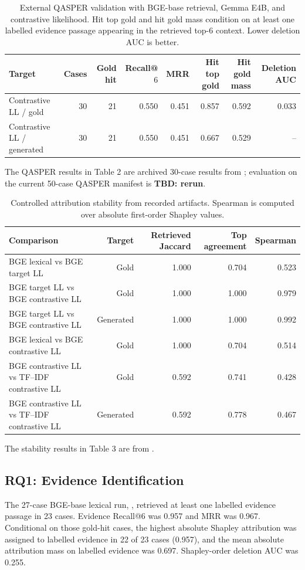 \documentclass[10pt]{article}
\newcommand{\tbd}[1]{\textbf{TBD: #1}}
\begin{document}
\begin{table}[ht]
\centering
\small
\caption{External QASPER validation with BGE-base retrieval, Gemma E4B, and
contrastive likelihood. Hit top gold and hit gold mass condition on at least
one labelled evidence passage appearing in the retrieved top-6 context. Lower
deletion AUC is better.}
\begin{tabular}{lrrrrrrr}
\toprule
Target & Cases & Gold hit & Recall@$6$ & MRR & Hit top gold & Hit gold mass & Deletion AUC \\
\midrule
Contrastive LL / gold & 30 & 21 & 0.550 & 0.451 & 0.857 & 0.592 & 0.033 \\
Contrastive LL / generated & 30 & 21 & 0.550 & 0.451 & 0.667 & 0.529 & -- \\
\bottomrule
\end{tabular}
\end{table}
The QASPER results in Table 2 are archived 30-case results from
; evaluation on the
current 50-case QASPER manifest is \tbd{rerun}.

\begin{table}[ht]
\centering
\small
\caption{Controlled attribution stability from recorded artifacts. Spearman is
computed over absolute first-order Shapley values.}
\begin{tabular}{lrrrr}
\toprule
Comparison & Target & Retrieved Jaccard & Top agreement & Spearman \\
\midrule
BGE lexical vs BGE target LL & Gold & 1.000 & 0.704 & 0.523 \\
BGE target LL vs BGE contrastive LL & Gold & 1.000 & 1.000 & 0.979 \\
BGE target LL vs BGE contrastive LL & Generated & 1.000 & 1.000 & 0.992 \\
BGE lexical vs BGE contrastive LL & Gold & 1.000 & 0.704 & 0.514 \\
BGE contrastive LL vs TF--IDF contrastive LL & Gold & 0.592 & 0.741 & 0.428 \\
BGE contrastive LL vs TF--IDF contrastive LL & Generated & 0.592 & 0.778 & 0.467 \\
\bottomrule
\end{tabular}
\end{table}
The stability results in Table 3 are from
.

\subsection{RQ1: Evidence Identification}
The 27-case BGE-base lexical run,
, retrieved at
least one labelled evidence passage in 23 cases. Evidence Recall@6 was 0.957
and MRR was 0.967. Conditional on those gold-hit cases, the highest absolute
Shapley attribution was assigned to labelled evidence in 22 of 23 cases
(0.957), and the mean absolute attribution mass on labelled evidence was 0.697.
Shapley-order deletion AUC was 0.255.
\end{document}
